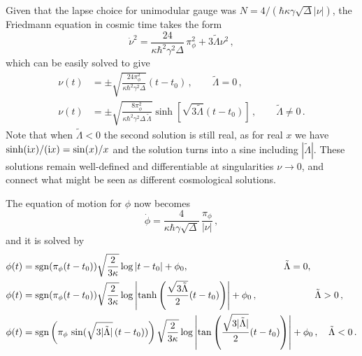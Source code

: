\documentclass[aps,prd,11pt,showkeys,nofootinbib]{revtex4-2}
\def\im{{\rm i}}
\begin{document}
Given that the lapse choice for unimodular gauge was $N=4/(\hbar\kappa\gamma\sqrt{\Delta}|\nu|)$, the Friedmann equation in cosmic time takes the form
\begin{equation}
    \dot \nu^2 = \frac{24}{\kappa\hbar^2\gamma^2\Delta}\,\pi_\phi^2 +3\tilde{\Lambda}\nu^2\,,
\end{equation}
which can be easily solved to give
\begin{align}
    \nu(t) &= \pm\sqrt{\frac{24\pi_\phi^2}{\kappa\hbar^2\gamma^2\Delta}}(t-t_0)\,, \qquad \tilde\Lambda = 0\,,\label{eq:vclasst L0}\\
    \nu(t) &= \pm\sqrt{\frac{8\pi_\phi^2}{\kappa\hbar^2\gamma^2\Delta\,\tilde\Lambda}}\sinh\left[\sqrt{3\tilde\Lambda}(t-t_0)\right]\,, \qquad \tilde\Lambda \neq 0\,.\label{eq:vclasst Lnot0}
\end{align}
Note that when $\tilde{\Lambda} < 0$ the second solution is still real, as for real $x$ we have $\sinh(\im x)/(\im x)=\sin(x)/x$ and the solution turns into a sine including $|\tilde\Lambda|$. These solutions remain well-defined and differentiable at  singularities $\nu\rightarrow 0$, and connect what might be seen as different cosmological solutions.

The equation of motion for $\phi$ now becomes
\begin{equation}
 \dot \phi = \frac{4}{\kappa \hbar \gamma \sqrt{\Delta}}\,\frac{\pi_\phi}{|\nu|}\,,
\end{equation}
and it is solved by
\begin{align}
    \phi(t) &= {\rm sgn}(\pi_\phi(t-t_0)) \sqrt{\frac{2}{3\kappa}}\log|t-t_0|+\phi_0, \qquad\qquad\qquad\qquad\qquad \tilde\Lambda=0,\\
    \phi(t) &= {\rm sgn}(\pi_\phi(t-t_0))\sqrt{\frac{2}{3\kappa}}\log\left| \tanh\left(\frac{\sqrt{3\tilde\Lambda}}{2}(t-t_0)\right) \right|+\phi_0\,, \qquad\qquad\qquad \tilde\Lambda > 0\,,\\
    \phi(t) &= \textrm{sgn}\left(\pi_\phi\,\sin(\sqrt{3|\tilde\Lambda|}\,(t-t_0))\right)\sqrt{\frac{2}{3\kappa}}\log\left|\tan\left(\frac{\sqrt{3|\tilde\Lambda|}}{2}(t-t_0)\right) \right|+\phi_0\,, \quad \tilde\Lambda < 0\,.
\end{align}
\end{document}
